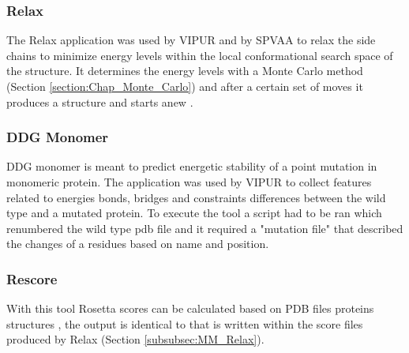 \subsubsection{Relax}
The Relax application was used by VIPUR and by SPVAA to relax the side chains to minimize energy levels within the local conformational search space \cite{rosetta_commons_relax_nodate} of the structure. 
It determines the energy levels with a Monte Carlo method (Section \ref{section:Chap_Monte_Carlo}) and after a certain set of moves it produces a structure and starts anew \cite{conway_relaxation_2014,tyka_alternate_2011}. 
\label{subsubsec:MM_Relax}

\subsubsection{DDG Monomer}
DDG monomer is meant to predict energetic stability of a point mutation in  monomeric protein. 
The application was used by VIPUR to collect features related to energies bonds, bridges  and constraints differences between the wild type and a mutated protein. 
To execute the tool a script had to be ran which renumbered the wild type pdb file and it required a "mutation file" that described the changes of a residues based on name and position\cite{leaver-fay_ddg_monomer_nodate}.
\label{subsubsec:MM_DDG_Monomer}

\subsubsection{Rescore}
With this tool Rosetta scores can be calculated based on PDB files proteins structures \cite{jared_score_2016} , the output is identical to that is written within the score files produced by Relax (Section \ref{subsubsec:MM_Relax}).
\label{subsubsec:MM_Rescore}

